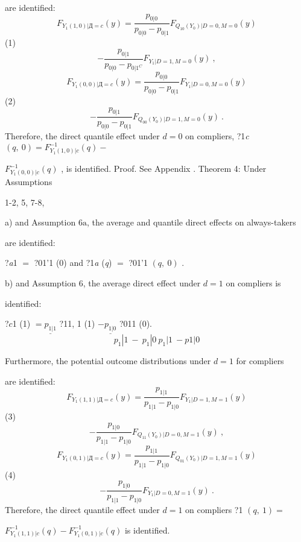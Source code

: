 \documentclass[a4paper,12pt]{article}
\begin{document}
are identified:
$$
F_{Y_{1}(1,0)|Д=c}(y)=\frac{p_{0|0}}{p_{0|0}-p_{0|1}}F_{Q_{10}(Y_{0})|D=0,M=0}(y)
$$
(1)
$$
-\frac{p_{0|1}}{p_{0|0}-p_{0|1^{C}}}F_{Y_{1}|D=1,M=0}(y)\ ,
$$
$$
F_{Y_{1}(0,0)|Д=c}(y)=\frac{p_{0|0}}{p_{0|0}-p_{0|1}}F_{Y_{1}|D=0,M=0}(y)
$$
(2)
$$
-\frac{p_{0|1}}{p_{0|0}-p_{0|1}}F_{Q_{00}(Y_{0})|D=1,M=0}(y)\ .
$$
Therefore, the direct quantile effect under $d=0$ on compliers, ?1{\it c} $(q,\ 0)=F_{Y_{1}(1,0)|c}^{-1}(q)-$

$F_{Y_{1}(0,0)|c}^{-1}(q)$ , is identified. Proof. See Appendix . Theorem 4: Under Assumptions

1-2, 5, 7-8,

a) and Assumption $6\mathrm{a}$, the average and quantile direct effects on always-takers

are identified:

?{\it a}1 $=$ ?01'1 (0) and ?1{\it a} ({\it q}) $=$ ?01'1 $(q,\ 0)$ .

b) and Assumption 6, the average direct effect under $d = 1$ on compliers is

identified:
\begin{center}
?$c$1 (1) $= \underline{p_{1|1}}$ ?11, 1 (1) $- \underline{p_{1|0}}$ ?011 (0).
$$
p_{1}|1\ -\ p_{1}|0\ p_{1}|1\ -p1|0
$$
\end{center}
Furthermore, the potential outcome distributions under $d = 1$ for compliers

are identified:
$$
F_{Y_{1}(1,1)|Д=c}(y)=\frac{p_{1|1}}{p_{1|1}-p_{1|0}}F_{Y_{1}|D=1,M=1}(y)
$$
(3)
$$
-\frac{p_{1|0}}{p_{1|1}-p_{1|0}}F_{Q_{11}(Y_{0})|D=0,M=1}(y)\ ,
$$
$$
F_{Y_{1}(0,1)|Д=c}(y)=\frac{p_{1|1}}{p_{1|1}-p_{1|0}}F_{Q_{01}(Y_{0})|D=1,M=1}(y)
$$
(4)
$$
-\frac{p_{1|0}}{p_{1|1}-p_{1|0}}F_{Y_{1}|D=0,M=1}(y)\ .
$$
Therefore, the direct quantile effect under $d = 1$ on compliers ?1 $(q,\ 1) =$

$F_{Y_{1}(1,1)|c}^{-1}(q)-F_{Y_{1}(0,1)|c}^{-1}(q)$ is identified.
\end{document}
